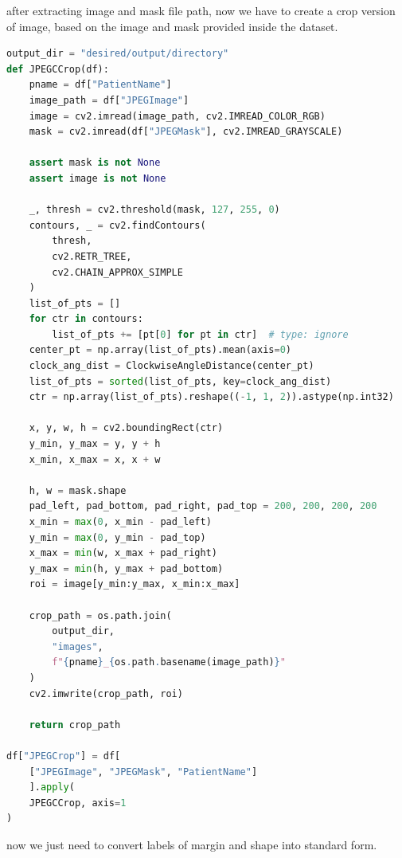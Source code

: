 \documentclass[11pt,a4paper]{article}
\begin{document}
after extracting image and mask file path, now we have to create a crop version of image,
based on the image and mask provided inside the dataset.

\begin{lstlisting}[language=Python, caption=Crop images based on provided mask]
output_dir = "desired/output/directory"
def JPEGCCrop(df):
    pname = df["PatientName"]
    image_path = df["JPEGImage"]
    image = cv2.imread(image_path, cv2.IMREAD_COLOR_RGB)
    mask = cv2.imread(df["JPEGMask"], cv2.IMREAD_GRAYSCALE)

    assert mask is not None
    assert image is not None

    _, thresh = cv2.threshold(mask, 127, 255, 0)
    contours, _ = cv2.findContours(
        thresh, 
        cv2.RETR_TREE, 
        cv2.CHAIN_APPROX_SIMPLE
    )
    list_of_pts = []
    for ctr in contours:
        list_of_pts += [pt[0] for pt in ctr]  # type: ignore
    center_pt = np.array(list_of_pts).mean(axis=0)
    clock_ang_dist = ClockwiseAngleDistance(center_pt)
    list_of_pts = sorted(list_of_pts, key=clock_ang_dist)
    ctr = np.array(list_of_pts).reshape((-1, 1, 2)).astype(np.int32)

    x, y, w, h = cv2.boundingRect(ctr)
    y_min, y_max = y, y + h
    x_min, x_max = x, x + w

    h, w = mask.shape
    pad_left, pad_bottom, pad_right, pad_top = 200, 200, 200, 200
    x_min = max(0, x_min - pad_left)
    y_min = max(0, y_min - pad_top)
    x_max = min(w, x_max + pad_right)
    y_max = min(h, y_max + pad_bottom)
    roi = image[y_min:y_max, x_min:x_max]

    crop_path = os.path.join(
        output_dir, 
        "images", 
        f"{pname}_{os.path.basename(image_path)}"
    )
    cv2.imwrite(crop_path, roi)

    return crop_path

df["JPEGCrop"] = df[
    ["JPEGImage", "JPEGMask", "PatientName"]
    ].apply(
    JPEGCCrop, axis=1
)
\end{lstlisting}

now we just need to convert labels of margin and shape into standard form.
\end{document}
